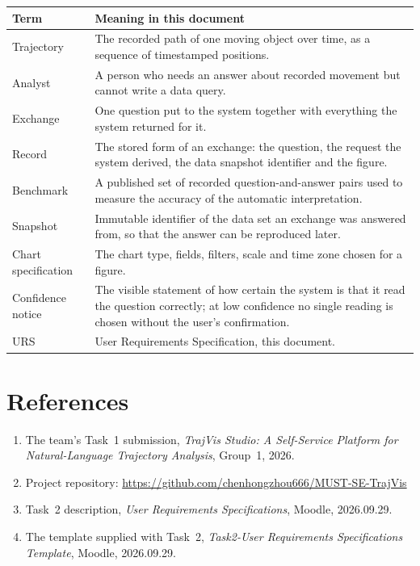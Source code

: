 \documentclass[12pt,a4paper]{report}
\begin{document}
\begin{table}[H]
  \centering
  \begin{tabular}{@{}l >{\raggedright\arraybackslash}p{11.8cm}@{}}
    \toprule[1.5pt]
    \textbf{Term} & \textbf{Meaning in this document} \\
    \midrule
    Trajectory & The recorded path of one moving object over time, as a
      sequence of timestamped positions. \\
    Analyst & A person who needs an answer about recorded movement but
      cannot write a data query. \\
    Exchange & One question put to the system together with everything the
      system returned for it. \\
    Record & The stored form of an exchange: the question, the request the
      system derived, the data snapshot identifier and the figure. \\
    Benchmark & A published set of recorded question-and-answer pairs used
      to measure the accuracy of the automatic interpretation. \\
    Snapshot & Immutable identifier of the data set an exchange was answered
      from, so that the answer can be reproduced later. \\
    Chart specification & The chart type, fields, filters, scale and time
      zone chosen for a figure. \\
    Confidence notice & The visible statement of how certain the system is
      that it read the question correctly; at low confidence no single
      reading is chosen without the user's confirmation. \\
    URS & User Requirements Specification, this document. \\
    \bottomrule[1.5pt]
  \end{tabular}
\end{table}

\section{References}
\label{sec:references}

\begin{enumerate}
  \item The team's Task~1 submission, \emph{TrajVis Studio: A Self-Service
    Platform for Natural-Language Trajectory Analysis}, Group~1, 2026.
  \item Project repository:
    \url{https://github.com/chenhongzhou666/MUST-SE-TrajVis}
  \item Task~2 description, \emph{User Requirements Specifications},
    Moodle, 2026.09.29.
  \item The template supplied with Task~2,
    \emph{Task2-User Requirements Specifications Template}, Moodle,
    2026.09.29.
\end{enumerate}
\end{document}
